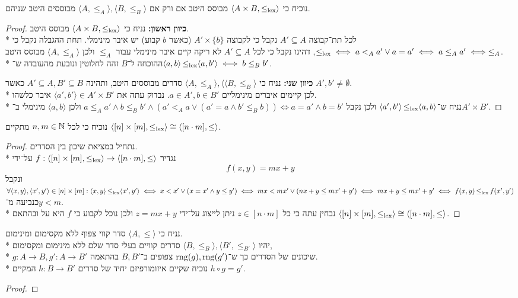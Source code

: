 \Subquestion{}
נוכיח כי $\langle A \times B, \operatorname{\le_\text{lex}} \rangle$ מבוסס היטב אם ורק אם $\langle A, \le_A \rangle, \langle B, \le_B \rangle$ מבוססים היטב שניהם.
\begin{proof}
	\textbf{כיוון ראשון:}
	נניח כי $\langle A \times B, \operatorname{\le_\text{lex}} \rangle$ מבוסס היטב. \\*
	לכל תת־קבוצה $A' \subseteq A$ נקבל כי לקבוצה $A' \times \{ b \}$ (כאשר $b$ קבוע) יש איבר מינימלי. תחת ההגבלה נקבל כי $\operatorname{\le_\text{lex}} \iff a <_A a' \lor a = a' \iff a \le_A a' \iff \le_A$,
	דהינו נקבל כי לכל $A' \subseteq A$ לא ריקה קיים איבר מינימלי עבור $\le_A$ ולכן $\langle A, \le_A \rangle$ מבוסס היטב. \\*
	ההוכחה ל־$B$ זהה לחלוטין ונובעת מהעובדה ש־$\langle a, b \rangle \operatorname{\le_\text{lex}} \langle a, b' \rangle \iff b \le_B b'$.

	\textbf{כיוון שני:}
	נניח כי $\langle A, \le_A \rangle, \langle \langle B, \le_B \rangle$ סדרים מבוססים היטב, ותהינה $A' \subseteq A, B' \subseteq B$ כאשר $A', b' \ne \emptyset$. \\*
	לכן קיימים איברים מינימליים $a \in A', b \in B'$.
	נבדוק עתה את $\langle a', b' \rangle \in A' \times B'$ איבר כלשהו. \\*
	נניח ש־$\langle a', b' \rangle \operatorname{\le_\text{lex}} \langle a, b \rangle$ ולכן נקבל $a \le_A a' \land b \le_B b' \land (a' <_A a \lor (a' = a \land b' \le_B b)) \iff a = a' \land b = b'$ ולכן $\langle a, b \rangle$ מינימלי ב־$A' \times B'$.
\end{proof}

\Question{}
נוכיח כי לכל $n, m \in \mathbb{N}$ מתקיים $\langle [n] \times [m], \operatorname{\le_\text{lex}} \rangle \cong \langle [n \cdot m ], \le \rangle$.
\begin{proof}
	נתחיל במציאת שיכון בין הסדרים. \\*
	נגדיר $f : \langle [n] \times [m], \operatorname{\le_\text{lex}} \rangle \to \langle [n \cdot m ], \le \rangle$ על־ידי
	\[
		f(x, y) = mx + y
	\]
	ונקבל $\forall \langle x, y \rangle, \langle x', y' \rangle \in [n] \times [m] : \langle x, y \rangle \operatorname{\le_\text{lex}} \langle x', y' \rangle \iff x < x' \lor (x = x' \land y \le y') \iff mx < mx' \lor (nx + y \le mx' + y') \iff mx + y \le mx' + y' \iff f(x, y) \operatorname{\le_\text{lex}} f(x', y')$ כנביעה מ־$y < m$. \\*
	נבחין עתה כי כל $z \in [n \cdot m ]$ ניתן לייצוג על־ידי $z = mx + y$ ולכן נוכל לקבוע כי $f$ היא על ובהתאם $\langle [n] \times [m], \operatorname{\le_\text{lex}} \rangle \cong \langle [n \cdot m ], \le \rangle$.
\end{proof}

\Question{}
נניח כי $\langle A, \le \rangle$ סדר קווי צפוף ללא מקסימום ומינימום. \\*
יהיו $\langle B, \le_B \rangle, \langle B', \le_{B'} \rangle$ סדרים קוויים בעלי סדר שלם ללא מינימום ומקסימום, \\*
$g : A \to B, g' : A \to B'$ שיכונים של הסדרים כך ש־$\operatorname{rng}(g), \operatorname{rng}(g')$ צפופים ב־$B, B'$ בהתאמה. \\*
נוכיח שקיים איזומורפיזם יחיד של סדרים $h : B \to B'$ המקיים $h \circ g = g'$.
\begin{proof}
	
\end{proof}



